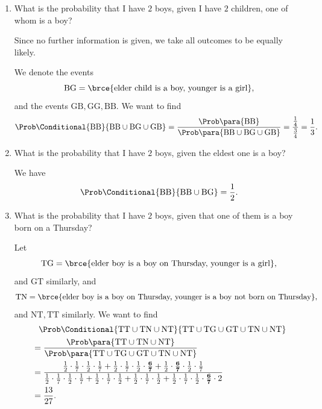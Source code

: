 \begin{example}
    \label{ex:children-thursday}%
    \begin{enumerate}
        \item What is the probability that I have \(2\) boys, given I have \(2\) children, one of whom is a boy?
    
            Since no further information is given, we take all outcomes to be equally likely.

            We denote the events
            \[
                \mathrm{BG} = \brce{\text{elder child is a boy, younger is a girl}},
            \]
            and the events \(\mathrm{GB}, \mathrm{GG}, \mathrm{BB}\). We want to find
            \[
                \Prob\Conditional{\mathrm{BB}}{\mathrm{BB} \cup \mathrm{BG} \cup \mathrm{GB}} = \frac{\Prob\para{\mathrm{BB}}}{\Prob\para{\mathrm{BB} \cup \mathrm{BG} \cup \mathrm{GB}}} = \frac{\frac{1}{4}}{\frac{3}{4}} = \frac{1}{3}.
            \]

        \item What is the probability that I have \(2\) boys, given the eldest one is a boy?
        
            We have
            \[
                \Prob\Conditional{\mathrm{BB}}{\mathrm{BB} \cup \mathrm{BG}} = \frac{1}{2}.
            \]

        \item What is the probability that I have \(2\) boys, given that one of them is a boy born on a Thursday?
        
        Let
        \[
            \mathrm{TG} = \brce{\text{elder boy is a boy on Thursday, younger is a girl}},
        \]
        and \(\mathrm{GT}\) similarly, and
        \[
            \mathrm{TN} = \brce{\text{elder boy is a boy on Thursday, younger is a boy not born on Thursday}},
        \]
        and \(\mathrm{NT, TT}\) similarly. We want to find
        \begin{align*}
            &\phantom{=} \Prob\Conditional{\mathrm{TT} \cup \mathrm{TN} \cup \mathrm{NT}}{\mathrm{TT} \cup \mathrm{TG} \cup \mathrm{GT} \cup \mathrm{TN} \cup \mathrm{NT}} \\
            &= \frac{\Prob\para{\mathrm{TT} \cup \mathrm{TN} \cup \mathrm{NT}}}{\Prob\para{\mathrm{TT} \cup \mathrm{TG} \cup \mathrm{GT} \cup \mathrm{TN} \cup \mathrm{NT}}} \\
            &= \frac{\frac{1}{2} \cdot \frac{1}{7} \cdot \frac{1}{2} \cdot \frac{1}{7} + \frac{1}{2} \cdot \frac{1}{7} \cdot \frac{1}{2} \cdot \mathbf{\frac{6}{7}} + \frac{1}{2} \cdot \mathbf{\frac{6}{7}} \cdot \frac{1}{2} \cdot \frac{1}{7}}{\frac{1}{2} \cdot \frac{1}{7} \cdot \frac{1}{2} \cdot \frac{1}{7} + \frac{1}{2} \cdot \frac{1}{7} \cdot \frac{1}{2} + \frac{1}{2} \cdot \frac{1}{7} \cdot \frac{1}{2} + \frac{1}{2} \cdot \frac{1}{7} \cdot \frac{1}{2} \cdot \mathbf{\frac{6}{7}} \cdot 2}
 \\
            &= \frac{13}{27}.
        \end{align*}
    \end{enumerate}
\end{example}

